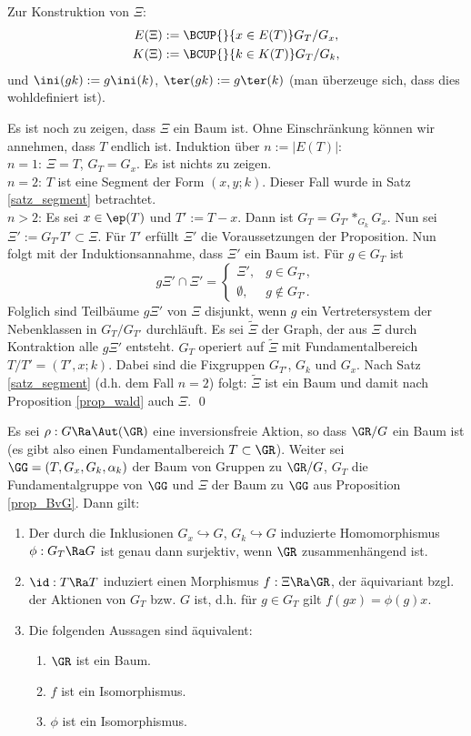 \bew Zur Konstruktion von $\Xi$:
\begin{align*}
E(\Xi) &:= \BCUP{}{x\in E(T)} G_T/G_x, \\
K(\Xi) &:= \BCUP{}{k\in K(T)} G_T/G_k,
\end{align*}
und $\ini(gk):=g \ini(k)$, $\ter(gk):=g \ter(k)$ (man überzeuge sich,
dass dies wohldefiniert ist).

Es ist noch zu zeigen, dass $\Xi$ ein Baum ist. Ohne Einschränkung
können wir annehmen, dass $T$ endlich ist. Induktion über
$n:=|E(T)|$:\\
$n=1$: $\Xi=T$, $G_T=G_x$. Es ist nichts zu zeigen.\\
$n=2$: $T$ ist eine Segment der Form $(x,y;k)$. Dieser Fall wurde
in Satz \ref{satz_segment} betrachtet.\\
$n>2$: Es sei $x\in \ep(T)$ und $T':=T-x$. Dann ist
$G_T=G_{T'}*_{G_k} G_x$. Nun sei $\Xi' := G_{T'} T' \subset \Xi$.
Für $T'$ erfüllt $\Xi'$ die Voraussetzungen der Proposition.
Nun folgt mit der Induktionsannahme, dass $\Xi'$ ein Baum ist.
Für $g\in G_T$ ist
\[
g\Xi' \cap \Xi' =
\left\{
\begin{matrix}
\Xi', &  g\in G_{T'}, \\
\emptyset, & g\not\in G_{T'}.
\end{matrix}\right.
\]
Folglich sind Teilbäume $g\Xi'$ von $\Xi$ disjunkt, wenn $g$ ein
Vertretersystem der Nebenklassen in $G_T/G_{T'}$ durchläuft.
Es sei $\tilde{\Xi}$ der Graph, der aus $\Xi$ durch
Kontraktion alle $g \Xi'$ entsteht. $G_T$ operiert auf $\tilde{\Xi}$
mit Fundamentalbereich $T/T'=(T',x;k)$.
Dabei sind die Fixgruppen $G_{T'}$, $G_k$ und $G_x$.
Nach Satz \ref{satz_segment} (d.h. dem Fall $n=2$) folgt:
$\tilde{\Xi}$ ist ein Baum und damit nach
Proposition \ref{prop_wald} auch $\Xi$.
\qed

\PROP \label{prop_fundbereich}
Es sei $\rho:G\Ra\Aut(\GR)$ eine inversionsfreie Aktion,
so dass $\GR/G$ ein Baum ist (es gibt also einen Fundamentalbereich
$T\subset \GR$).
Weiter sei $\GG=(T,G_x,G_k,\alpha_k)$ der Baum von Gruppen zu
$\GR/G$, $G_T$ die Fundamentalgruppe von $\GG$ und $\Xi$ der
Baum zu $\GG$ aus Proposition \ref{prop_BvG}. Dann gilt:
\begin{enumerate}
\item Der durch die Inklusionen $G_x \hookrightarrow G$,
$G_k \hookrightarrow G$ induzierte Homomorphismus
$\phi:G_T \Ra G$ ist genau dann surjektiv, wenn $\GR$
zusammenhängend ist.
\item $\id:T\Ra T$ induziert einen Morphismus $f:\Xi\Ra\GR$,
der äquivariant bzgl. der Aktionen von
$G_T$ bzw. $G$ ist, d.h. für $g\in G_T$ gilt
$f(gx)=\phi(g)x$.
\item Die folgenden Aussagen sind äquivalent:
\begin{enumerate}
\item $\GR$ ist ein Baum.
\item $f$ ist ein Isomorphismus.
\item $\phi$ ist ein Isomorphismus.
\end{enumerate}
\end{enumerate}

